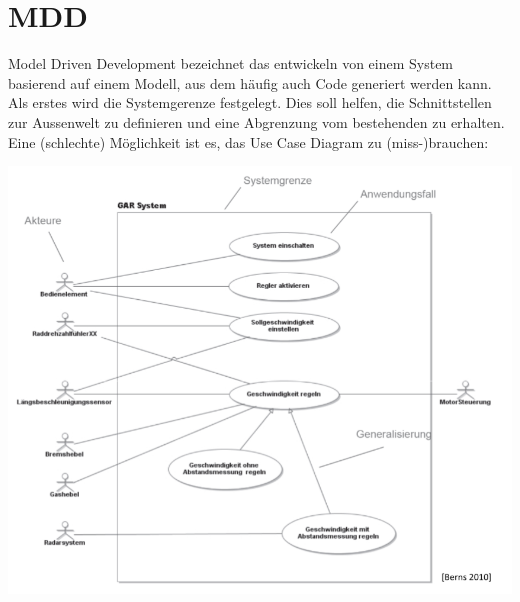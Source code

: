 \section{MDD}
Model Driven Development bezeichnet das entwickeln von einem System basierend auf einem Modell, aus dem häufig auch Code generiert werden kann.
Als erstes wird die Systemgerenze festgelegt. Dies soll helfen, die Schnittstellen zur Aussenwelt zu definieren und eine Abgrenzung vom bestehenden zu erhalten. Eine (schlechte) Möglichkeit ist es, das Use Case Diagram zu (miss-)brauchen:
\begin{center}
	\includegraphics[width=\columnwidth]{Images/use-case}
\end{center}


